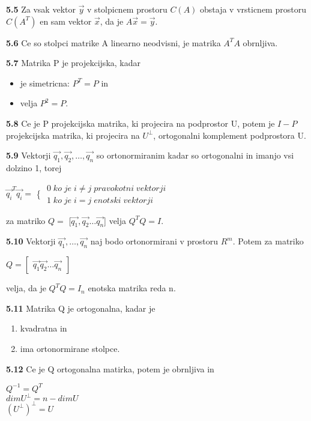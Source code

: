 \documentclass{article}
\begin{document}
\begin{multicols}{4}
	\textbf{5.5} Za vsak vektor $\vec{y}$ v stolpicnem prostoru $C(A)$ obstaja v vrsticnem prostoru $C(A^{T})$ en sam
	vektor $\vec{x}$, da je $A\vec{x} = \vec{y}$.

	\textbf{5.6} Ce so stolpci matrike A linearno neodvisni, je matrika $A^{T}A$ obrnljiva.

	\textbf{5.7} Matrika P je projekcijska, kadar
	\begin{itemize}
		\item je simetricna: $P^{T} = P$ in
		\item velja $P^{2} = P$.
	\end{itemize}

	\textbf{5.8} Ce je P projekcijska matrika, ki projecira na podprostor U, potem je $I -P$ projekcijska
	matrika, ki projecira na $U^{\perp}$, ortogonalni komplement podprostora U.

	\textbf{5.9} Vektorji $\vec{q_{1}}, \vec{q_{2}}, \dots, \vec{q_{n}}$ so ortonormiranim kadar so ortogonalni in imanjo vsi
	dolzino 1, torej
	\begin{center}
		$\vec{q_{i}}^{T}\vec{q_{i}} = $ \Bigg\{
		$\begin{matrix}
				0\;  ko\; je\; i \neq j\; pravokotni\; vektorji \\
				1\;  ko\; je\; i = j\; enotski\; vektorji
			\end{matrix}$
	\end{center}
	za matriko $Q =$ [$\vec{q_{1}}, \vec{q_{2}} \dots \vec{q_{n}}$]  velja $Q^{T}Q = I$.

	\textbf{5.10} Vektorji $\vec{q_{1}}, \dots, \vec{q_{n}}$ naj bodo ortonormirani v prostoru $R^{m}$. Potem
	za matriko
	\begin{center}
		$Q = \begin{bmatrix}
				\vec{q_{1}} \vec{q_{2}} \dots \vec{q_{n}}
			\end{bmatrix}$
	\end{center}
	velja, da je $Q^{T}Q = I_{n}$ enotska matrika reda n.

	\textbf{5.11} Matrika Q je ortogonalna, kadar je
	\begin{enumerate}
		\item kvadratna in
		\item ima ortonormirane stolpce.
	\end{enumerate}

	\textbf{5.12} Ce je Q ortogonalna matirka, potem je obrnljiva in
	\begin{center}
		$Q^{-1} = Q^{T}$\\
		$dimU^{\perp} = n - dimU$\\
		$(U^{\perp})^{\perp} = U$
	\end{center}


\end{multicols}
\end{document}
